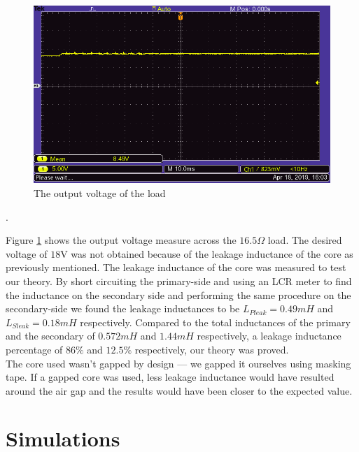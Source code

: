 \documentclass[a4paper, 12pt]{article}
\begin{document}
\begin{figure}[H]
  \centering
  \includegraphics[width=\textwidth]{images/output_from_load.png}
  \caption{The output voltage of the load}
  \label{fig:output_from_load}
\end{figure}. 

Figure \ref{fig:output_from_load} shows the output voltage measure across the $16.5\Omega$ load. The desired voltage of $18$V was not obtained because of the leakage inductance of the core as previously mentioned. The leakage inductance of the core was measured to test our theory. By short circuiting the primary-side and using an LCR meter to find the inductance on the secondary side and performing the same procedure on the secondary-side we found the leakage inductances to be $L_{Pleak} = 0.49mH$ and $L_{Sleak} = 0.18mH$ respectively. Compared to the total inductances of the primary and the secondary of $0.572mH$ and $1.44mH$ respectively, a leakage inductance percentage of $86\%$ and $12.5\%$ respectively, our theory was proved.\\

The core used wasn't gapped by design --- we gapped it ourselves using masking tape. If a gapped core was used, less leakage inductance would have resulted around the air gap and the results would have been closer to the expected value.

\section{Simulations} %
  \label{sec:simulations}
\end{document}

